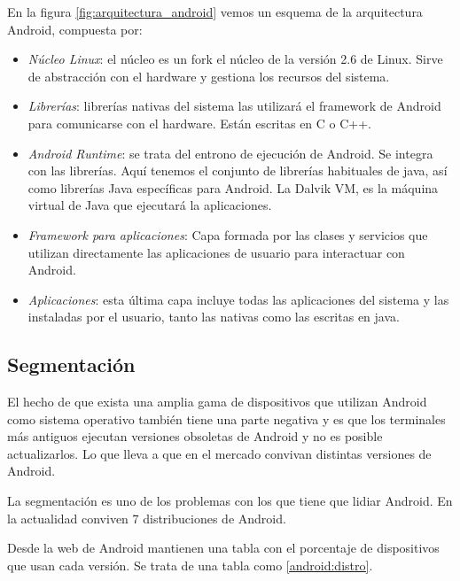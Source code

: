 En la figura \ref{fig:arquitectura_android} vemos un esquema de la arquitectura Android, compuesta por:
\begin{itemize}
\item \emph{Núcleo Linux}: el núcleo es un fork el núcleo de la versión 2.6 de Linux. Sirve de abstracción con el hardware y gestiona los recursos del sistema. 
\item \emph{Librerías}: librerías nativas del sistema las utilizará el framework de Android para comunicarse con el hardware. Están escritas en C o C++.
\item \emph{Android Runtime}: se trata del entrono de ejecución de Android. Se integra con las librerías. Aquí tenemos el conjunto de librerías habituales de java, así como librerías Java específicas para Android. La Dalvik VM, es la máquina virtual de Java que ejecutará la aplicaciones. 
\item \emph{Framework para aplicaciones}: Capa formada por las clases y servicios que utilizan directamente las aplicaciones de usuario para interactuar con Android. 
\item \emph{Aplicaciones}: esta última capa incluye todas las aplicaciones del sistema y las instaladas por el usuario, tanto las nativas como las escritas en java.

\end{itemize}




\subsection{Segmentación}
El hecho de que exista una amplia gama de dispositivos que utilizan Android como sistema operativo también tiene una parte negativa y es que los terminales más antiguos ejecutan versiones obsoletas de Android y no es posible actualizarlos. Lo que lleva a que en el mercado convivan distintas versiones de Android.\par

La segmentación es uno de los problemas con los que tiene que lidiar Android. En la actualidad conviven 7 distribuciones de Android.\par
Desde la web de Android \cite{android} mantienen una tabla con el porcentaje de dispositivos que usan cada versión. Se trata de una tabla como \ref{android:distro}.\medskip\par

